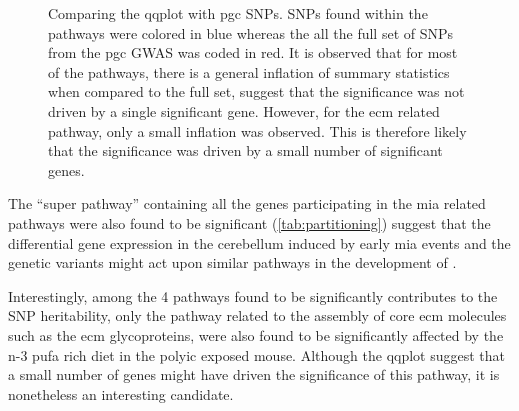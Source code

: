 \begin{figure}
{		
		\label{fig:calcium}
	}
	\caption[Comparing the QQ plots with PGC SNPs]
	{Comparing the \gls{qqplot} with \gls{pgc} \glspl{SNP}.
		\glspl{SNP} found within the pathways were colored in blue whereas the all the full set of \glspl{SNP} from the \gls{pgc} \gls{GWAS} was coded in red.
		It is observed that for most of the pathways, there is a general inflation of summary statistics when compared to the full set, suggest that the significance was not driven by a single significant gene.
		However, for the \gls{ecm} related pathway, only a small inflation was observed. 
		This is therefore likely that the significance was driven by a small number of significant genes. 
		} 
	\label{fig:qqAll}
\end{figure}

The ``super pathway'' containing all the genes participating in the \gls{mia} related pathways were also found to be significant (\cref{tab:partitioning}) suggest that the differential gene expression in the cerebellum induced by early \gls{mia} events and the genetic variants might act upon similar pathways in the development of .

Interestingly, among the 4 pathways found to be significantly contributes to the \gls{SNP} heritability, only the pathway related to the assembly of core \gls{ecm} molecules such as the \gls{ecm} glycoproteins, were also found to be significantly affected by the n-3 \gls{pufa} rich diet in the \gls{polyic} exposed mouse. 
Although the \gls{qqplot} suggest that a small number of genes might have driven the significance of this pathway, it is nonetheless an interesting candidate.

